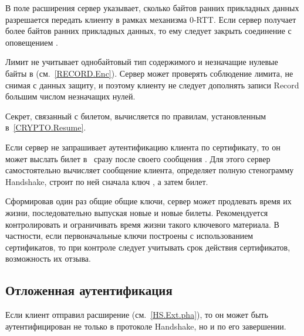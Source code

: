 В поле  расширения  
сервер указывает, сколько байтов ранних прикладных данных разрешается передать 
клиенту в рамках механизма \mbox{0-RTT}. 
%
Если сервер получает более  байтов ранних прикладных
данных, то ему следует закрыть соединение с оповещением
.

Лимит  не учитывает однобайтовый тип содержимого и 
незначащие нулевые байты в  (см.~\ref{RECORD.Enc}).
%
Сервер может проверять соблюдение лимита, не снимая с данных защиту, и поэтому 
клиенту не следует дополнять записи Record большим числом незначащих нулей.

Секрет, связанный с билетом, вычисляется по правилам, установленным 
в~\ref{CRYPTO.Resume}.

\begin{note}
Если сервер не запрашивает аутентификацию клиента по сертификату, то он может 
выслать билет в~ сразу после своего 
сообщения .
%
Для этого сервер самостоятельно вычисляет сообщение 
 клиента, определяет полную стенограмму Handshake, 
строит по ней сначала ключ , а затем билет.
\end{note}



\begin{note}
Сформировав один раз общие общие ключи, сервер может продлевать 
время их жизни, последовательно выпуская новые и новые билеты. 
Рекомендуется контролировать и ограничивать время жизни такого ключевого 
материала. 
%
В частности, если первоначальные ключи построены с использованием сертификатов, 
то при контроле следует учитывать срок действия сертификатов,  
возможность их отзыва. 
\end{note}

\subsection{Отложенная аутентификация}\label{HS.Post.Auth} 

Если клиент отправил расширение  
(см.~\ref{HS.Ext.pha}), то он может быть аутентифицирован не только в протоколе 
Handshake, но и по его завершении.

